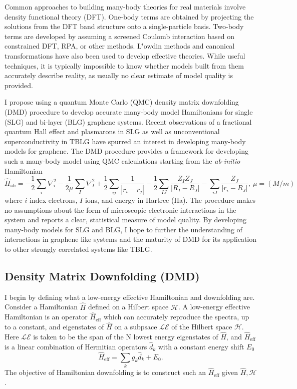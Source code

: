\documentclass[12pt]{article}
\begin{document}
Common approaches to building many-body theories for real materials involve density functional theory (DFT).
One-body terms are obtained by projecting the solutions from the DFT band structure onto a single-particle basis.
Two-body terms are developed by assuming a screened Coulomb interaction based on constrained DFT, RPA, or other methods.
L\''{o}wdin methods and canonical transformations have also been used to develop effective theories.
While useful techniques, it is typically impossible to know whether models built from them accurately describe reality, as usually no clear estimate of model quality is provided.

I propose using a quantum Monte Carlo (QMC) density matrix downfolding (DMD) procedure to develop accurate many-body model Hamiltonians for single (SLG) and bi-layer (BLG) graphene systems.
Recent observations of a fractional quantum Hall effect and plasmarons in SLG as well as unconventional superconductivity in TBLG have spurred an interest in developing many-body models for graphene.
The DMD procedure provides a framework for developing such a many-body model using QMC calculations starting from the \textit{ab-initio} Hamiltonian 
\begin{equation}
\hat{H}_\text{ab} = -\frac{1}{2} \sum_{i} \nabla_i^2 -\frac{1}{2\mu}\sum_{I} \nabla_I^2 + \frac{1}{2}\sum_{ij} \frac{1}{|r_i - r_j|} + \frac{1}{2}\sum_{IJ} \frac{Z_I Z_J}{|R_I - R_J|} - \sum_{iJ}\frac{Z_J}{|r_i - R_J|},\ \mu = (M/m)
\label{Hab}
\end{equation}
where $i$ index electrons, $I$ ions, and energy in Hartree (Ha).
The procedure makes no assumptions about the form of microscopic electronic interactions in the system and reports a clear, statistical measure of model quality.
By developing many-body models for SLG and BLG, I hope to further the understanding of interactions in graphene like systems and the maturity of DMD for its application to other strongly correlated systems like TBLG.

\subsection{Density Matrix Downfolding (DMD)}
I begin by defining what a low-energy effective Hamiltonian and downfolding are.
Consider a Hamiltonian $\hat{H}$ defined on a Hilbert space $\mathcal{H}$.
A low-energy effective Hamiltonian is an operator $\hat{H}_\text{eff}$ which can accurately reproduce the spectra, up to a constant, and eigenstates of $\hat{H}$ on a subpsace $\mathcal{LE}$ of the Hilbert space $\mathcal{H}$.
Here $\mathcal{LE}$ is taken to be the span of the N lowest energy eigenstates of $\hat{H}$, and $\hat{H}_\text{eff}$ is a linear combination of Hermitian operators $\hat{d}_k$ with a constant energy shift $E_0$
\begin{equation}
\hat{H}_\text{eff} = \sum_{k} g_k \hat{d}_k  + E_0.
\label{eq:Heff}
\end{equation}
The objective of Hamiltonian downfolding is to construct such an $\hat{H}_\text{eff}$ given $\hat{H}, \mathcal{H}$.
\end{document}
